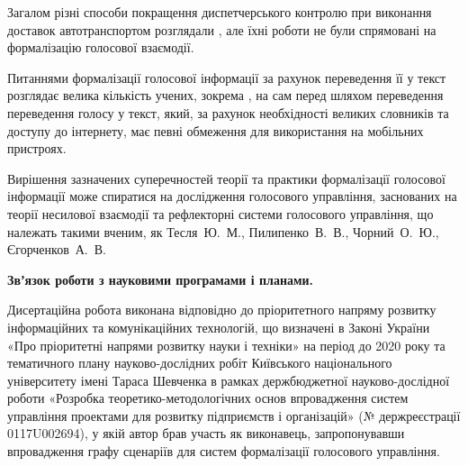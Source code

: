 Загалом різні способи покращення диспетчерського контролю при виконання доставок автотранспортом розглядали , але їхні роботи не були спрямовані на формалізацію голосової взаємодії.

Питаннями формалізації голосової інформації за рахунок переведення її у текст розглядає велика кількість учених, зокрема , на сам перед шляхом переведення переведення голосу у текст, який, за рахунок необхідності великих словників та доступу до інтернету, має певні обмеження для використання на мобільних пристроях.

Вирішення зазначених суперечностей теорії та практики формалізації голосової інформації може спиратися на дослідження голосового управління, заснованих на теорії несилової взаємодії та рефлекторні системи голосового управління, що належать такими вченим, як Тесля~Ю.~М., Пилипенко~В.~В., Чорний~О.~Ю., Єгорченков~А.~В.


\textbf{Звʼязок роботи з науковими програмами і планами.}

Дисертаційна робота виконана відповідно до пріоритетного напряму розвитку інформаційних та комунікаційних технологій, що визначені в Законі України «Про пріоритетні напрями розвитку науки і техніки» на період до 2020 року та тематичного плану науково-дослідних робіт Київського національного університету імені Тараса Шевченка в рамках держбюджетної науково-дослідної роботи «Розробка теоретико-методологічних основ впровадження систем управління проектами для розвитку підприємств і організацій» (№ держреєстрації 0117U002694), у якій автор брав участь як виконавець, запропонувавши впровадження графу сценаріїв для систем формалізації голосового управління.

